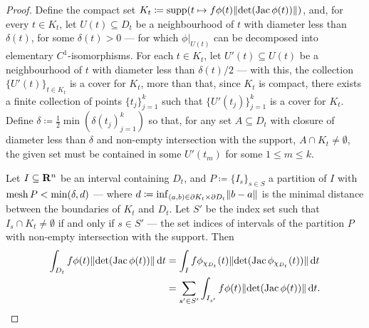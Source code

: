 \begin{proof}
Define the compact set \(K_t \coloneq \operatorname{supp}(t \mapsto f \phi(t) \lVert\det(\operatorname{Jac}
\phi(t))\rVert)\), and, for every \(t \in K_t\), let \(U(t) \subseteq D_t\) be a
neighbourhood of \(t\) with diameter less than \(\delta(t)\), for some
\(\delta(t) > 0\) --- for which \(\phi|_{U(t)}\) can be decomposed into
elementary \(C^1\)-isomorphisms. For each \(t \in K_t\), let \(U'(t) \subseteq
U(t)\) be a neighbourhood of \(t\) with diameter less than \(\delta(t)/2\) ---
with this, the collection \(\{U'(t)\}_{t \in K_t}\) is a cover for \(K_t\), more
than that, since \(K_t\) is compact, there exists a finite collection of points
\(\{t_{j}\}_{j=1}^k\) such that \(\{U'(t_j)\}_{j=1}^k\) is a cover for
\(K_t\). Define \(\delta \coloneq \frac 1 2 \min(\delta(t_j)_{j=1}^k)\) so that,
for any set \(A \subseteq D_t\) with closure of diameter less than \(\delta\)
and non-empty intersection with the support, \(A \cap K_t \neq \emptyset\), the
given set must be contained in some \(U'(t_m)\) for some \(1 \leq m \leq k\).

Let \(I \subseteq \mathbf{R}^n\) be an interval containing \(D_t\), and \(P \coloneq
\{I_{s}\}_{s \in S}\) a partition of \(I\) with \(\operatorname{mesh} P < \min(\delta, d)\)
--- where \(d \coloneq \inf_{(a, b) \in \partial K_t \times \partial D_t}
\lVert b - a\rVert\) is the minimal distance between the boundaries of \(K_t\) and
\(D_{t}\). Let \(S'\) be the index set such that \(I_s \cap K_t \neq \emptyset\)
if and only if \(s \in S'\) --- the set indices of intervals of the partition
\(P\) with non-empty intersection with the support. Then
\begin{align*}
  \int_{D_t} f\phi(t) \lVert\det(\operatorname{Jac} \phi(t))\rVert\, \mathrm{d} t
  &= \int_I f \phi_{\chi_{D_t}}(t)
  \lVert\det(\operatorname{Jac} \phi_{\chi_{D_t}}(t))\rVert\, \mathrm{d} t \\
  &= \sum_{s' \in S'} \int_{I_{s'}} f \phi(t) \lVert\det(\operatorname{Jac} \phi(t))\rVert\, \mathrm{d} t.
\end{align*}


\end{proof}
